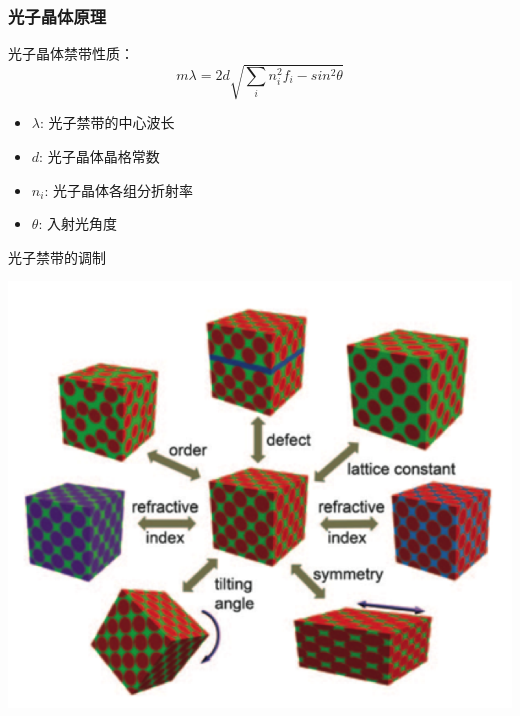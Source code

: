 \documentclass{beamer}
\begin{document}
\begin{frame}
  \frametitle{光子晶体原理}
  \begin{minipage}{0.48\textwidth}
    光子晶体禁带性质：
    \begin{equation*}
      m\lambda=2d\sqrt{\sum_{i}n_i^2f_i-sin^2\theta}
    \end{equation*}

    \pause

    \begin{itemize}[<+-| alert@+>]
      \item
      $\lambda$: 光子禁带的中心波长
      \item
      \large $d$: 光子晶体晶格常数
      \item
      $n_i$: 光子晶体各组分折射率
      \item
      $\theta$: 入射光角度
    \end{itemize}
  \end{minipage}
  \hfill
  \pause
  \begin{minipage}{0.5\textwidth}
    光子禁带的调制
    \begin{center}
      \includegraphics[width=\linewidth]{figures/PhC_control.png}
    \end{center}
  \end{minipage}
\end{frame}
  
\end{document}
